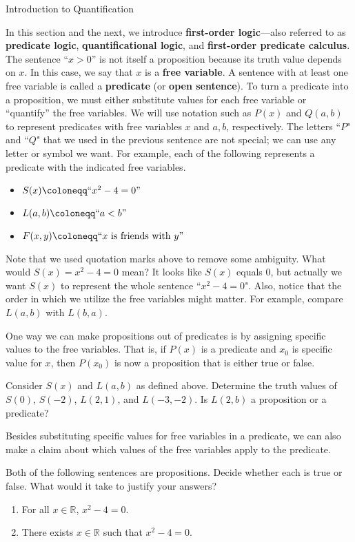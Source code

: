 \begin{section}{Introduction to Quantification}

In this section and the next, we introduce \textbf{first-order logic}---also referred to as \textbf{predicate logic}, \textbf{quantificational logic}, and \textbf{first-order predicate calculus}. The sentence ``$x>0$'' is not itself a proposition because its truth value depends on $x$.  In this case, we say that $x$ is a \textbf{free variable}. A sentence with at least one free variable is called a \textbf{predicate} (or \textbf{open sentence}). To turn a predicate into a proposition, we must either substitute values for each free variable or ``quantify'' the free variables. We will use notation such as $\boxed{P(x)}$ and $\boxed{Q(a,b)}$ to represent predicates with free variables $x$ and $a,b$, respectively. The letters ``$P$" and ``$Q$" that we used in the previous sentence are not special; we can use any letter or symbol we want. For example, each of the following represents a predicate with the indicated free variables.
\begin{itemize}
\item $S(x)\coloneqq ``x^2-4=0"$
\item $L(a,b)\coloneqq ``a<b"$
\item $F(x,y)\coloneqq ``x \mbox{ is friends with } y"$
\end{itemize}
Note that we used quotation marks above to remove some ambiguity.  What would $S(x)=x^2-4=0$ mean?  It looks like $S(x)$ equals 0, but actually we want $S(x)$ to represent the whole sentence ``$x^2-4=0$". Also, notice that the order in which we utilize the free variables might matter.  For example, compare $L(a,b)$ with $L(b,a)$.

One way we can make propositions out of predicates is by assigning specific values to the free variables.  That is, if $P(x)$ is a predicate and $x_0$ is specific value for $x$, then $P(x_0)$ is now a proposition that is either true or false.

\begin{problem}
Consider $S(x)$ and $L(a,b)$ as defined above. Determine the truth values of $S(0)$, $S(-2)$, $L(2,1)$, and $L(-3,-2)$. Is $L(2,b)$ a proposition or a predicate?
\end{problem}

Besides substituting specific values for free variables in a predicate, we can also make a claim about which values of the free variables apply to the predicate.

\begin{problem}\label{ex:quantified predicates}
Both of the following sentences are propositions. Decide whether each is true or false. What would it take to justify your answers?
\begin{enumerate}[label=\textrm{(\alph*)}]
\item For all $x\in\mathbb{R}$, $x^2-4=0$.
\item There exists $x\in\mathbb{R}$ such that $x^2-4=0$.
\end{enumerate}
\end{problem}


\end{section}
